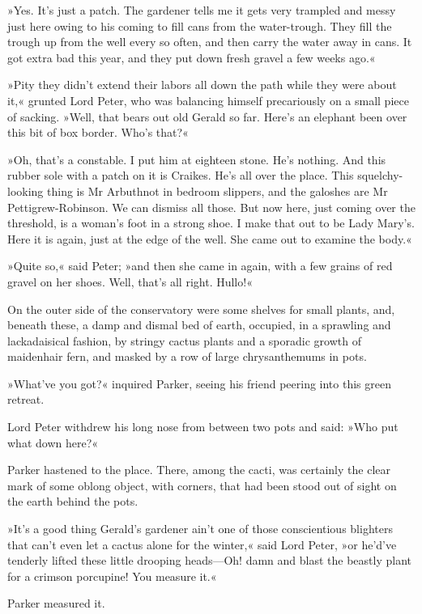 »Yes. It's just a patch. The gardener tells me it gets very trampled and messy just here owing to his coming to fill cans from the water-trough. They fill the trough up from the well every so often, and then carry the water away in cans. It got extra bad this year, and they put down fresh gravel a few weeks ago.«

»Pity they didn't extend their labors all down the path while they were about it,« grunted Lord Peter, who was balancing himself precariously on a small piece of sacking. »Well, that bears out old Gerald so far. Here's an elephant been over this bit of box border. Who's that?«

»Oh, that's a constable. I put him at eighteen stone. He's nothing. And this rubber sole with a patch on it is Craikes. He's all over the place. This squelchy-looking thing is Mr Arbuthnot in bedroom slippers, and the galoshes are Mr Pettigrew-Robinson. We can dismiss all those. But now here, just coming over the threshold, is a woman's foot in a strong shoe. I make that out to be Lady Mary's. Here it is again, just at the edge of the well. She came out to examine the body.«

»Quite so,« said Peter; »and then she came in again, with a few grains of red gravel on her shoes. Well, that's all right. Hullo!«

On the outer side of the conservatory were some shelves for small plants, and, beneath these, a damp and dismal bed of earth, occupied, in a sprawling and lackadaisical fashion, by stringy cactus plants and a sporadic growth of maidenhair fern, and masked by a row of large chrysanthemums in pots.

»What've you got?« inquired Parker, seeing his friend peering into this green retreat.

Lord Peter withdrew his long nose from between two pots and said: »Who put what down here?«

Parker hastened to the place. There, among the cacti, was certainly the clear mark of some oblong object, with corners, that had been stood out of sight on the earth behind the pots.

»It's a good thing Gerald's gardener ain't one of those conscientious blighters that can't even let a cactus alone for the winter,« said Lord Peter, »or he'd've tenderly lifted these little drooping heads\allowbreak---\allowbreak Oh! damn and blast the beastly plant for a crimson porcupine! You measure it.«

Parker measured it.

